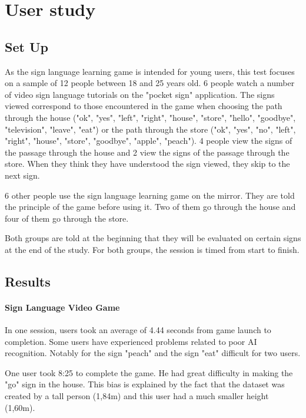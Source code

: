 \section{User study}

\subsection{Set Up}

As the sign language learning game is intended for young users, this test focuses on a sample of 12 people between 18 and 25 years old.
6 people watch a number of video sign language tutorials on the "pocket sign" application. The signs viewed correspond to those encountered in the game when choosing the path through the house ("ok", "yes", "left", "right", "house", "store", "hello", "goodbye", "television", "leave", "eat") or the path through the store ("ok", "yes", "no", "left", "right", "house", "store", "goodbye", "apple", "peach"). 4 people view the signs of the passage through the house and 2 view the signs of the passage through the store.
When they think they have understood the sign viewed, they skip to the next sign. 

6 other people use the sign language learning game on the mirror. They are told the principle of the game before using it. Two of them go through the house and four of them go through the store.

Both groups are told at the beginning that they will be evaluated on certain signs at the end of the study. 
For both groups, the session is timed from start to finish.

\subsection{Results}

\paragraph{Sign Language Video Game}

In one session, users took an average of 4.44 seconds from game launch to completion. Some users have experienced problems related to poor AI recognition.
Notably for the sign "peach" and the sign "eat" difficult for two users.

One user took 8:25 to complete the game. He had great difficulty in making the "go" sign in the house. This bias is explained by the fact that the dataset was created by a tall person (1,84m) and this user had a much smaller height (1,60m). 

